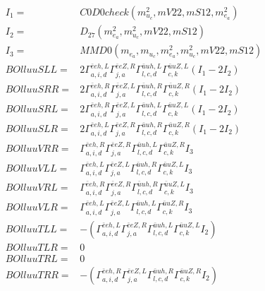 \documentclass[A4,landscape]{article}
\begin{document}
\begin{align} 
I_1 = & C0D0check(m^2_{u_{{c}}}, mV22, mS12, m^2_{e_{{a}}}) \\ 
I_2 = & D_{27}(m^2_{e_{{a}}}, m^2_{u_{{c}}}, mV22, mS12) \\ 
I_3 = & MMD0(m_{e_{{a}}}, m_{u_{{c}}}, m^2_{e_{{a}}}, m^2_{u_{{c}}}, mV22, mS12) \\ 
  BOlluuSLL= & 2  \Gamma^{\bar{e}e h ,L}_{a, i, d} \Gamma^{\bar{e}e Z ,R}_{j, a} \Gamma^{\bar{u}u h ,L}_{l, c, d} \Gamma^{\bar{u}u Z ,L}_{c, k} (I_1 - 2 I_2) \\ 
  BOlluuSRR= & 2  \Gamma^{\bar{e}e h ,R}_{a, i, d} \Gamma^{\bar{e}e Z ,L}_{j, a} \Gamma^{\bar{u}u h ,R}_{l, c, d} \Gamma^{\bar{u}u Z ,R}_{c, k} (I_1 - 2 I_2) \\ 
  BOlluuSRL= & 2  \Gamma^{\bar{e}e h ,R}_{a, i, d} \Gamma^{\bar{e}e Z ,L}_{j, a} \Gamma^{\bar{u}u h ,L}_{l, c, d} \Gamma^{\bar{u}u Z ,L}_{c, k} (I_1 - 2 I_2) \\ 
  BOlluuSLR= & 2  \Gamma^{\bar{e}e h ,L}_{a, i, d} \Gamma^{\bar{e}e Z ,R}_{j, a} \Gamma^{\bar{u}u h ,R}_{l, c, d} \Gamma^{\bar{u}u Z ,R}_{c, k} (I_1 - 2 I_2) \\ 
  BOlluuVRR= &  \Gamma^{\bar{e}e h ,R}_{a, i, d} \Gamma^{\bar{e}e Z ,R}_{j, a} \Gamma^{\bar{u}u h ,L}_{l, c, d} \Gamma^{\bar{u}u Z ,R}_{c, k} I_3 \\ 
  BOlluuVLL= &  \Gamma^{\bar{e}e h ,L}_{a, i, d} \Gamma^{\bar{e}e Z ,L}_{j, a} \Gamma^{\bar{u}u h ,R}_{l, c, d} \Gamma^{\bar{u}u Z ,L}_{c, k} I_3 \\ 
  BOlluuVRL= &  \Gamma^{\bar{e}e h ,R}_{a, i, d} \Gamma^{\bar{e}e Z ,R}_{j, a} \Gamma^{\bar{u}u h ,R}_{l, c, d} \Gamma^{\bar{u}u Z ,L}_{c, k} I_3 \\ 
  BOlluuVLR= &  \Gamma^{\bar{e}e h ,L}_{a, i, d} \Gamma^{\bar{e}e Z ,L}_{j, a} \Gamma^{\bar{u}u h ,L}_{l, c, d} \Gamma^{\bar{u}u Z ,R}_{c, k} I_3 \\ 
  BOlluuTLL= & -( \Gamma^{\bar{e}e h ,L}_{a, i, d} \Gamma^{\bar{e}e Z ,R}_{j, a} \Gamma^{\bar{u}u h ,L}_{l, c, d} \Gamma^{\bar{u}u Z ,L}_{c, k} I_2) \\ 
  BOlluuTLR= & 0 \\ 
  BOlluuTRL= & 0 \\ 
  BOlluuTRR= & -( \Gamma^{\bar{e}e h ,R}_{a, i, d} \Gamma^{\bar{e}e Z ,L}_{j, a} \Gamma^{\bar{u}u h ,R}_{l, c, d} \Gamma^{\bar{u}u Z ,R}_{c, k} I_2) \\ 
\end{align} 
\end{document}

